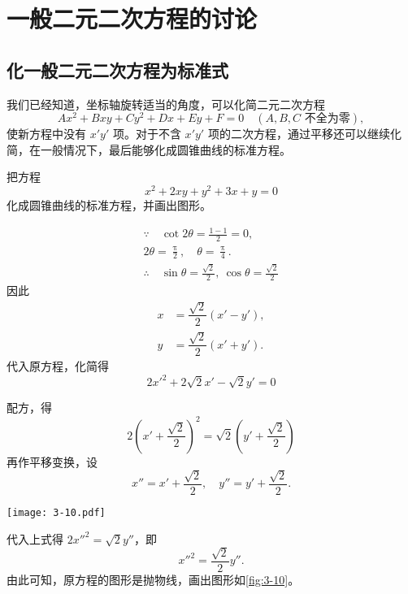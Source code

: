 \section{一般二元二次方程的讨论}
\subsection{化一般二元二次方程为标准式}
我们已经知道，坐标轴旋转适当的角度，可以化简二元二次方程
\[Ax^2+Bxy+Cy^2+Dx+Ey+F=0\quad(A,B,C\text{ 不全为零}),\]
使新方程中没有 $x'y'$ 项。对于不含 $x'y'$ 项的二次方程，通过平移还可以继续化简，在一般情况下，最后能够化成圆锥曲线的标准方程。
\begin{example}
  把方程
  \[x^2+2xy+y^2+3x+y=0\]
  化成圆锥曲线的标准方程，并画出图形。
\end{example}
\begin{solution}
  \begin{gather*}
    \because\quad \cot2\theta=\frac{1-1}{2}=0,\\
    2\theta=\frac{\uppi}{2},\quad\theta=\frac{\uppi}{4}.\\
    \therefore\quad \sin\theta=\frac{\sqrt{2}}{2},\ \cos\theta=\frac{\sqrt{2}}{2}
  \end{gather*}
  因此
  \begin{align*}
    x&=\dfrac{\sqrt{2}}{2}(x'-y'),\\
    y&=\dfrac{\sqrt{2}}{2}(x'+y').
  \end{align*}
  代入原方程，化简得
  \[2x'^2+2\sqrt{2}x'-\sqrt{2}y'=0\]
\end{solution}

\noindent
\begin{minipage}{0.6\linewidth}%
  配方，得
  \[2\left(x'+\dfrac{\sqrt{2}}{2}\right)^2=\sqrt{2}\left(y'+\dfrac{\sqrt{2}}{2}\right)\]
  再作平移变换，设
  \[
    x''=x'+\dfrac{\sqrt{2}}{2},\quad
    y''=y'+\dfrac{\sqrt{2}}{2}.
  \]
\end{minipage}\hfill
\begin{minipage}{0.32\linewidth}\centering
\begin{figurehere}
  \texttt{[image: 3-10.pdf]}
  \caption{}\label{fig:3-10}
\end{figurehere}
\end{minipage}

\medskip\noindent
代入上式得 $2x''^2= \sqrt{2}y''$，即
\[x''^2= \frac{\sqrt{2}}{2}y''.\]
由此可知，原方程的图形是抛物线，画出图形如\cref{fig:3-10}。


